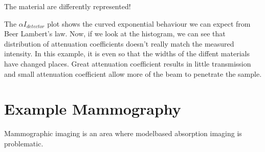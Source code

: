 \documentclass[letterpaper,10pt,english]{sphinxmanual}
\begin{document}
\begin{sphinxVerbatim}[commandchars=\\\{\}]
     
\end{sphinxVerbatim}

\noindent{}

\sphinxAtStartPar
The material are differently represented!

\sphinxAtStartPar
The \(\alpha\)\sphinxhyphen{}\(I_{detector}\) plot shows the curved exponential behaviour we can expect from Beer Lambert’s law. Now, if we look at the histogram, we can see that distribution of attenuation coefficients doesn’t really match the measured intensity. In this example, it is even so that the widths of the diffent materials have changed places. Great attenuation coefficient results in little transmission and small attenuation coefficient allow more of the beam to penetrate the sample.


\chapter{Example Mammography}
\label{\detokenize{04-BasicSegmentation:example-mammography}}
\sphinxAtStartPar
Mammographic imaging is an area where model\sphinxhyphen{}based absorption imaging is problematic.
\end{document}
